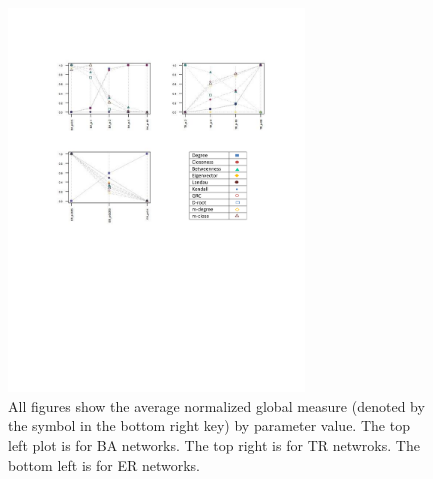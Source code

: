 \documentclass[3p,times]{elsarticle}
\begin{document}
\begin{figure}
	\begin{center}
		\caption{\label{fig::Simulated Parameters} All figures show the average normalized global measure (denoted by the symbol in the bottom right key) by parameter value. The top left plot is for BA networks. The top right is for TR netwroks. The bottom left is for ER networks.}
		\includegraphics[width = 0.70\textwidth]{./images/Norm_Pars.pdf}
	\end{center}
\end{figure}
\end{document}
